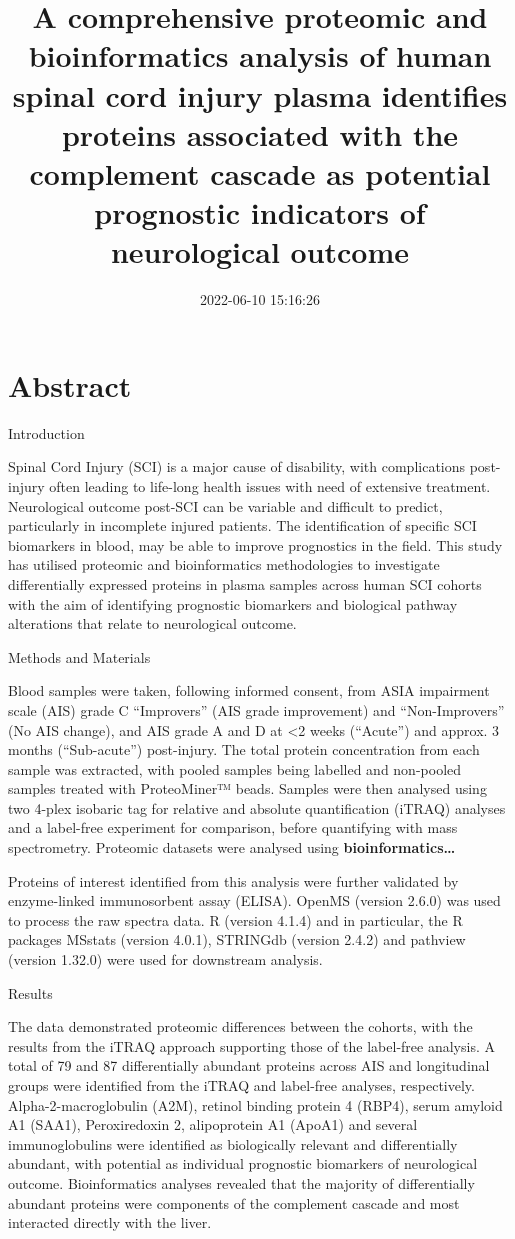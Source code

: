 \documentclass[9pt,lineno]{elife}
\title{A comprehensive proteomic and bioinformatics analysis of human spinal cord injury plasma identifies proteins associated with the complement cascade as potential prognostic indicators of neurological outcome}
\author{}
\date{2022-06-10 15:16:26}
\begin{document}
\maketitle

\hypertarget{abstract}{%
\section{Abstract}\label{abstract}}

Introduction

Spinal Cord Injury (SCI) is a major cause of disability, with complications post-injury often leading to life-long health issues with need of extensive treatment.
Neurological outcome post-SCI can be variable and difficult to predict, particularly in incomplete injured patients.
The identification of specific SCI biomarkers in blood, may be able to improve prognostics in the field.
This study has utilised proteomic and bioinformatics methodologies to investigate differentially expressed proteins in plasma samples across human SCI cohorts with the aim of identifying prognostic biomarkers and biological pathway alterations that relate to neurological outcome.

Methods and Materials

Blood samples were taken, following informed consent, from ASIA impairment scale (AIS) grade C ``Improvers'' (AIS grade improvement) and ``Non-Improvers'' (No AIS change), and AIS grade A and D at \textless2 weeks (``Acute'') and approx.
3 months (``Sub-acute'') post-injury.
The total protein concentration from each sample was extracted, with pooled samples being labelled and non-pooled samples treated with ProteoMiner™ beads.
Samples were then analysed using two 4-plex isobaric tag for relative and absolute quantification (iTRAQ) analyses and a label-free experiment for comparison, before quantifying with mass spectrometry.
Proteomic datasets were analysed using \textbf{bioinformatics\ldots{}}

Proteins of interest identified from this analysis were further validated by enzyme-linked immunosorbent assay (ELISA).
OpenMS (version 2.6.0) was used to process the raw spectra data.
R (version 4.1.4) and in particular, the R packages MSstats (version 4.0.1), STRINGdb (version 2.4.2) and pathview (version 1.32.0) were used for downstream analysis.

Results

The data demonstrated proteomic differences between the cohorts, with the results from the iTRAQ approach supporting those of the label-free analysis.
A total of 79 and 87 differentially abundant proteins across AIS and longitudinal groups were identified from the iTRAQ and label-free analyses, respectively.
Alpha-2-macroglobulin (A2M), retinol binding protein 4 (RBP4), serum amyloid A1 (SAA1), Peroxiredoxin 2, alipoprotein A1 (ApoA1) and several immunoglobulins were identified as biologically relevant and differentially abundant, with potential as individual prognostic biomarkers of neurological outcome.
Bioinformatics analyses revealed that the majority of differentially abundant proteins were components of the complement cascade and most interacted directly with the liver.
\end{document}
